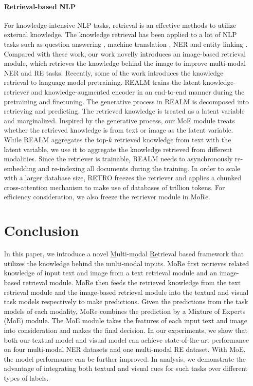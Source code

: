 \documentclass[11pt]{article}
\begin{document}
\paragraph{Retrieval-based NLP}
For knowledge-intensive NLP tasks, retrieval is an effective methods to utilize external knowledge. The knowledge retrieval has been applied to a lot of NLP tasks such as question answering \cite{liu2020k,karpukhin-etal-2020-dense, NEURIPS2020_6b493230,xu2021human, izacard-grave-2021-leveraging}, machine translation \cite{gu2018search,zhang-etal-2018-guiding,xu-etal-2020-boosting}, NER \cite{wang-etal-2021-improving,wang-etal-2022-damo,zhang-etal-2022-domain} and entity linking \cite{zhang-etal-2022-iclr,huang-etal-2022-nlpcc}. Compared with these work, our work novelly introduces an image-based retrieval module, which retrieves the knowledge behind the image to improve multi-modal NER and RE tasks. Recently, some of the work introduces the knowledge retrieval to language model pretraining. REALM \cite{guu2020realm} trains the latent knowledge-retriever and knowledge-augmented encoder in an end-to-end manner during the pretraining and finetuning. The generative process in REALM is decomposed into retrieving and predicting. The retrieved knowledge is treated as a latent variable and marginalized. Inspired by the generative process, our MoE module treats whether the retrieved knowledge is from text or image as the latent variable. While REALM aggregates the top-$k$ retrieved knowledge from text with the latent variable, we use it to aggregate the knowledge retrieved from different modalities. Since the retriever is trainable, REALM needs to asynchronously re-embedding and re-indexing all documents during the training. In order to scale with a larger database size, RETRO \cite{DBLP:journals/corr/abs-2112-04426} freezes the retriever and applies a chunked cross-attention mechanism to make use of databases of trillion tokens. For efficiency consideration, we also freeze the retriever module in MoRe. 

\section{Conclusion}
In this paper, we introduce a novel \underline{M}ulti-m\underline{o}dal \underline{Re}trieval based framework that utilizes the knowledge behind the multi-modal inputs. MoRe first retrieves related knowledge of input text and image from a text retrieval module and an image-based retrieval module. MoRe then feeds the retrieved knowledge from the text retrieval module and the image-based retrieval module into the textual and visual task models respectively to make predictions. Given the predictions from the task models of each modality, MoRe combines the prediction by a Mixture of Experts (MoE) module. The MoE module takes the features of each input text and image into consideration and makes the final decision. In our experiments, we show that both our textual model and visual model can achieve state-of-the-art performance on four multi-modal NER datasets and one multi-modal RE dataset. With MoE, the model performance can be further improved. In analysis, we demonstrate the advantage of integrating both textual and visual cues for such tasks over different types of labels. 
\end{document}

